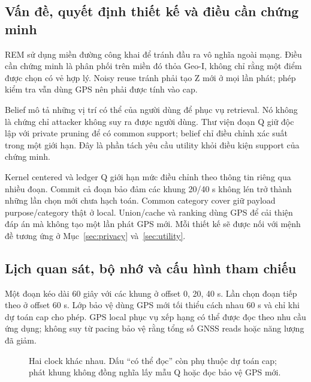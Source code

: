 \subsection{Vấn đề, quyết định thiết kế và điều cần chứng minh}
REM sử dụng miền đường công khai để tránh đầu ra vô nghĩa ngoài mạng. Điều cần chứng minh là phân
phối trên miền đó thỏa Geo-I, không chỉ rằng một điểm được chọn có vẻ hợp lý. Noisy reuse tránh phải
tạo Z mới ở mọi lần phát; phép kiểm tra vẫn dùng GPS nên phải được tính vào cap.

Belief mô tả những vị trí có thể của người dùng để phục vụ retrieval. Nó không là chứng chỉ attacker
không suy ra được người dùng. Thư viện đoạn Q giữ độc lập với private pruning để có common support;
belief chỉ điều chỉnh xác suất trong một giới hạn. Đây là phần tách yêu cầu utility khỏi điều kiện
support của chứng minh.

Kernel centered và ledger Q giới hạn mức điều chỉnh theo thông tin riêng qua nhiều đoạn. Commit cả
đoạn bảo đảm các khung 20/40 s không lén trở thành những lần chọn mới chưa hạch toán. Common category
cover giữ payload purpose/category thật ở local. Union/cache và ranking dùng GPS để cải thiện đáp
án mà không tạo một lần phát GPS mới. Mỗi thiết kế sẽ được nối với mệnh đề tương ứng ở
Mục~\ref{sec:privacy} và~\ref{sec:utility}.

\subsection{Lịch quan sát, bộ nhớ và cấu hình tham chiếu}
Một đoạn kéo dài 60 giây với các khung ở offset 0, 20, 40 s. Lần chọn đoạn tiếp theo ở offset 60 s.
Lớp bảo vệ dùng GPS mới tối thiểu cách nhau 60 s và chỉ khi dự toán cap cho phép. GPS local phục vụ
xếp hạng có thể được đọc theo nhu cầu ứng dụng; không suy từ pacing bảo vệ rằng tổng số GNSS reads
hoặc năng lượng đã giảm.

\begin{figure}[htbp]\centering
{}
\caption{Hai clock khác nhau. Dấu ``có thể đọc'' còn phụ thuộc dự toán cap; phát khung không đồng nghĩa lấy mẫu Q hoặc đọc bảo vệ GPS mới.}
\label{fig:clock}
\end{figure}

